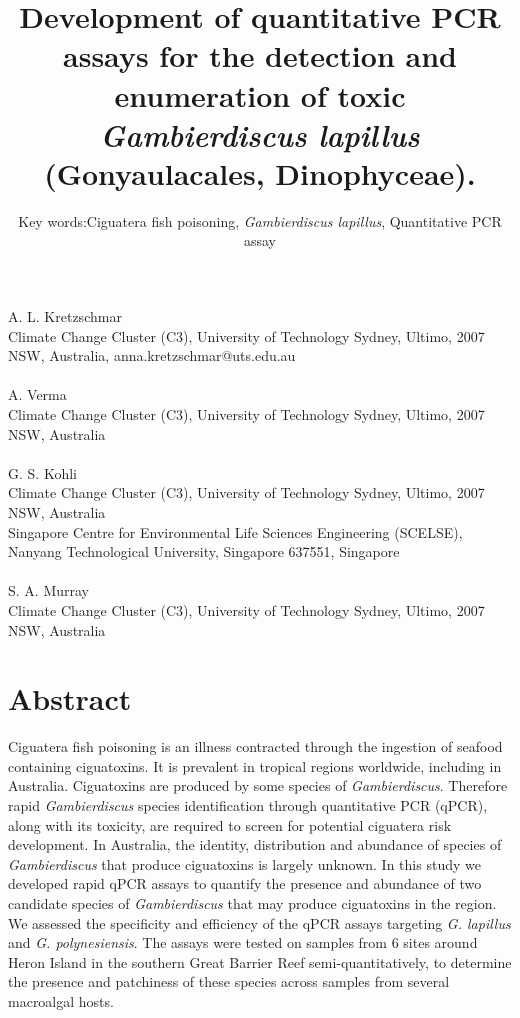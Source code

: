 \documentclass[12pt]{article}
\title{Development of quantitative PCR assays for the detection and enumeration of toxic \emph{Gambierdiscus lapillus} (Gonyaulacales, Dinophyceae).} %
\author{Key words:Ciguatera fish poisoning, \emph{Gambierdiscus lapillus}, Quantitative PCR assay}%
\date{}
\begin{document}
\maketitle
\paragraph{}A. L. Kretzschmar\\
Climate Change Cluster (C3), University of Technology Sydney, Ultimo, 2007 NSW, Australia, anna.kretzschmar@uts.edu.au
\paragraph{}A. Verma \\
Climate Change Cluster (C3), University of Technology Sydney, Ultimo, 2007 NSW, Australia
\paragraph{}G. S. Kohli\\
Climate Change Cluster (C3), University of Technology Sydney, Ultimo, 2007 NSW, Australia\\
Singapore Centre for Environmental Life Sciences Engineering (SCELSE), Nanyang Technological University, Singapore 637551, Singapore
\paragraph{}S. A. Murray\\
Climate Change Cluster (C3), University of Technology Sydney, Ultimo, 2007 NSW, Australia
\newpage
\section*{Abstract}
Ciguatera fish poisoning is an illness contracted through the ingestion of seafood containing ciguatoxins. 
It is prevalent in tropical regions worldwide, including in Australia. 
Ciguatoxins are produced by some species of \emph{Gambierdiscus}. 
Therefore rapid \emph{Gambierdiscus} species identification through quantitative PCR (qPCR), along with its toxicity, are required to screen for potential ciguatera risk development. 
In Australia, the identity, distribution and abundance of species of \textit{Gambierdiscus} that produce ciguatoxins is largely unknown. 
In this study we developed rapid qPCR assays to quantify the presence and abundance of two candidate species of \textit{Gambierdiscus} that may produce ciguatoxins in the region. %
We assessed the specificity and efficiency of the  qPCR assays targeting \textit{G. lapillus} and \textit{G. polynesiensis}. 
The assays were tested on samples from 6 sites around Heron Island in the southern Great Barrier Reef semi-quantitatively, to determine the presence and patchiness of these species across samples from several macroalgal hosts.  
\end{document}

